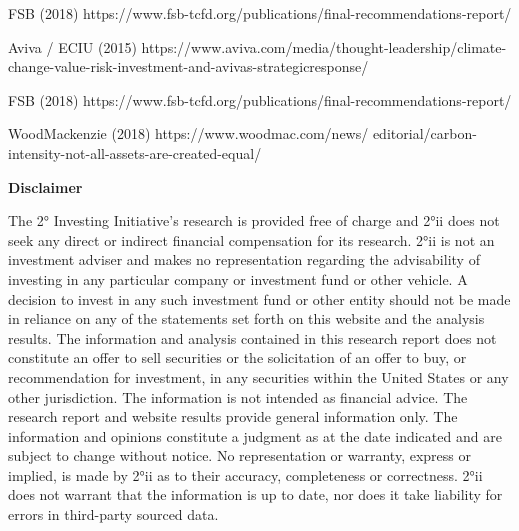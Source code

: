 \documentclass[10pt,table,a4]{article}\usepackage[]{graphicx}\usepackage[]{color}
\begin{document}
\begin{multicols}{2}
			FSB (2018) https://www.fsb-tcfd.org/publications/final-recommendations-report/
			
			Aviva / ECIU (2015) https://www.aviva.com/media/thought-leadership/climate-change-value-risk-investment-and-avivas-strategicresponse/
			
			FSB (2018) https://www.fsb-tcfd.org/publications/final-recommendations-report/
			
			WoodMackenzie (2018) https://www.woodmac.com/news/ editorial/carbon-intensity-not-all-assets-are-created-equal/ 
			
			\textbf{Disclaimer}
			
			The 2° Investing Initiative’s research is provided free of charge and 2°ii does not seek any direct or indirect financial compensation for its research. 2°ii is not an investment adviser and makes no representation regarding the advisability of investing in any particular company or investment fund or other vehicle. A decision to invest in any such investment fund or other entity should not be made in reliance on any of the statements set forth on this website and the analysis results. The information and analysis contained in this research report does not constitute an offer to sell securities or the solicitation of an offer to buy, or recommendation for investment, in any securities within the United States or any other jurisdiction. The information is not intended as financial advice. The research report and website results provide general information only. The information and opinions constitute a judgment as at the date indicated and are subject to change without notice. No representation or warranty, express or implied, is made by 2°ii as to their accuracy, completeness or correctness. 2°ii does not warrant that the information is up to date, nor does it take liability for errors in third-party sourced data.
		\end{multicols}

	
\end{document}
